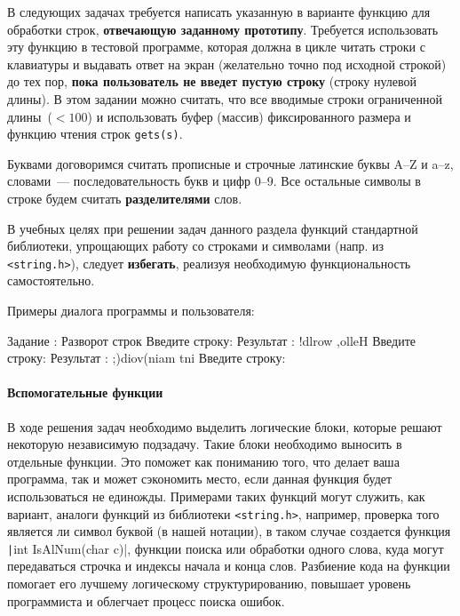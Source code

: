 
В следующих задачах требуется написать указанную в варианте функцию для
обработки строк, \textbf{отвечающую заданному прототипу}. Требуется использовать
эту функцию в тестовой программе, которая должна в цикле читать строки с
клавиатуры и выдавать ответ на экран (желательно точно под исходной строкой)
до тех пор, \textbf{пока пользователь не введет пустую строку} (строку нулевой длины).
В этом задании можно считать, что все вводимые строки ограниченной
длины~($<100$) и использовать буфер (массив) фиксированного размера и
функцию чтения строк \texttt{gets(s)}.

Буквами договоримся считать прописные и строчные латинские буквы 
A--Z и a--z, словами~--- последовательность букв и цифр 0--9. Все остальные
символы в строке будем считать \textbf{разделителями} слов.

В учебных целях при решении задач данного раздела функций стандартной
библиотеки, упрощающих работу со строками и символами (напр. из 
\texttt{<string.h>}), следует \textbf{избегать}, реализуя необходимую
функциональность самостоятельно.

Примеры диалога программы и пользователя:

\begin{zzoutput}
  Задание : Разворот строк
  Введите строку: 
  Результат     : !dlrow ,olleH
  Введите строку: 
  Результат     : ;)diov(niam tni
  Введите строку: \zzuser{ }
\end{zzoutput}


\zzsectionCOMMENTS

\paragraph{Вспомогательные функции}
В ходе решения задач необходимо выделить логические блоки, которые решают некоторую независимую подзадачу. Такие блоки необходимо выносить в отдельные функции. Это поможет как пониманию того, что делает ваша программа, так и может сэкономить место, если данная функция будет использоваться не единожды. Примерами таких функций могут служить, как вариант, аналоги функций из библиотеки \texttt{<string.h>}, например, проверка того является ли символ буквой (в нашей нотации), в таком случае создается функция \texttt|int IsAlNum(char c)|, функции поиска или обработки одного слова, куда могут передаваться строчка и индексы начала и конца слов.
Разбиение кода на функции помогает его лучшему логическому структурированию, повышает уровень программиста и облегчает процесс поиска ошибок.


